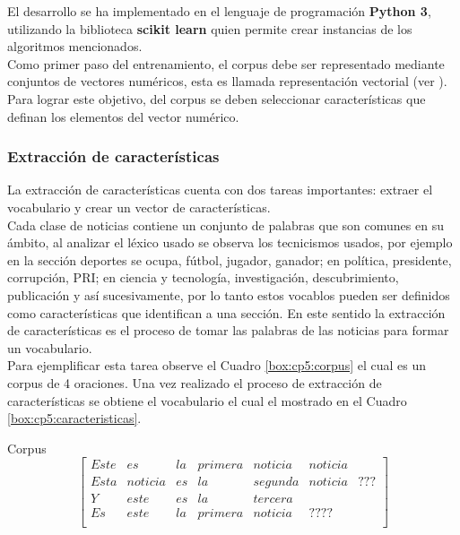 El desarrollo se ha implementado en el lenguaje de programación \textbf{Python 3}, utilizando la biblioteca \textbf{scikit learn} quien permite crear instancias de los algoritmos mencionados.\\

Como primer paso del entrenamiento, el corpus debe ser representado mediante conjuntos de vectores numéricos, esta es llamada representación vectorial (ver ). Para lograr este objetivo, del corpus se deben seleccionar características que definan los elementos del vector numérico.\\

\subsubsection{Extracción de características}

La extracción de características cuenta con dos tareas importantes: extraer el vocabulario y crear un vector de características.\\

Cada clase de noticias contiene un conjunto de palabras que son comunes en su ámbito, al analizar el léxico usado se observa los tecnicismos usados, por ejemplo en la sección deportes se ocupa, fútbol, jugador, ganador; en política, presidente, corrupción, PRI; en ciencia y tecnología, investigación, descubrimiento, publicación y así sucesivamente, por lo tanto estos vocablos pueden ser definidos como características que identifican a una sección. En este sentido la extracción de características es el proceso de tomar las palabras de las noticias para formar un vocabulario.\\

Para ejemplificar esta tarea observe el Cuadro \ref{box:cp5:corpus} el cual es un corpus de 4 oraciones. Una vez realizado el proceso de extracción de características se obtiene el vocabulario el cual el mostrado en el Cuadro \ref{box:cp5:caracteristicas}.\\

\begin{mygraybox}[label={box:cp5:corpus}]{Corpus} 
\begin{equation*}
\begin{bmatrix}
Este&es&la&primera&noticia&noticia\\
Esta&noticia&es&la&segunda&noticia&???\\
Y&este&es&la&tercera\\
Es&este&la&primera&noticia&????\\
\end{bmatrix}
\end{equation*}
\end{mygraybox}

